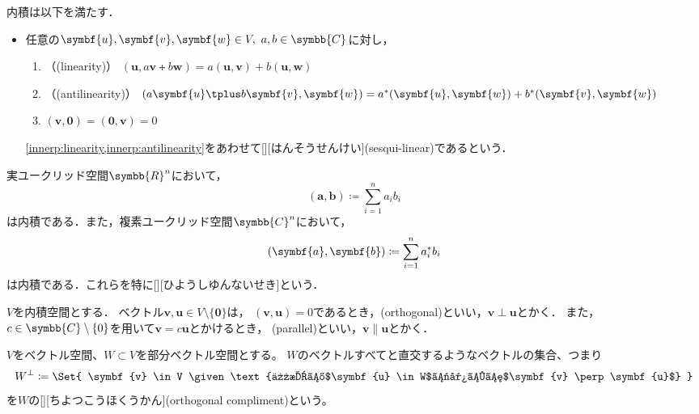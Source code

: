 \documentclass[../sotsu.tex]{subfiles}
\begin{document}
\begin{corollary}
    内積は以下を満たす．
    \begin{itemize}
        \item 任意の$\symbf{u}, \symbf{v}, \symbf{w} \in V, \  a, b \in \symbb{C}$に対し，
        \begin{enumerate}
            \item \label{innerp:linearity} （(linearity)） $(\symbf{u}, a\symbf{v} \tplus b\symbf{w}) = a (\symbf{u}, \symbf{v}) + b (\symbf{u}, \symbf{w})$
            \item \label{innerp:antilinearity} （(antilinearity)） $(a\symbf{u} \tplus b\symbf{v}, \symbf{w}) = \conj{a} (\symbf{u}, \symbf{w}) + \conj{b} (\symbf{v}, \symbf{w})$
            \item $(\symbf{v}, \symbf{0}) = (\symbf{0}, \symbf{v}) = 0$
        \end{enumerate}

        \cref{innerp:linearity,innerp:antilinearity}をあわせて[][はんそうせんけい](sesqui-linear)であるという．
    \end{itemize}
\end{corollary}


\begin{example}
    実ユークリッド空間$\symbb{R}^n$において，
    \begin{equation*}
        (\symbf{a}, \symbf{b}) \coloneq \sum_{i=1}^{n} a_i b_i
    \end{equation*}
    は内積である．また，複素ユークリッド空間$\symbb{C}^n$において，
    \begin{equation*}
        (\symbf{a}, \symbf{b}) \coloneq \sum_{i=1}^{n} \conj{a_i} b_i
    \end{equation*}
    は内積である．これらを特に[][ひようしゆんないせき]という．
\end{example}


\begin{definition}
    \label{dfn:orthogonal}
    \label{dfn:parallel}
    $V$を内積空間とする．
    ベクトル$\symbf{v}, \symbf{u} \in V \setminus \{\symbf{0}\}$は，
    $(\symbf{v}, \symbf{u}) = 0$であるとき，(orthogonal)といい，$\symbf{v} \perp \symbf{u}$とかく．
    また，$c \in \symbb{C} \setminus \{0\}$を用いて$\symbf{v} = c\symbf{u}$とかけるとき，
    (parallel)といい，$\symbf{v} \parallel \symbf{u}$とかく．
\end{definition}


\begin{definition}[直交補空間]
    $V$をベクトル空間、$W \subset V$を部分ベクトル空間とする。
    $W$のベクトルすべてと直交するようなベクトルの集合、つまり
    \begin{equation}
        W^\perp  \coloneq  \Set{  \symbf{v} \in V  
                                \given  \text{任意の$\symbf{u} \in W$に対して$\symbf{v} \perp \symbf{u}$}  }
    \end{equation}
    を$W$の[][ちよつこうほくうかん](orthogonal compliment)という。
\end{definition}
\end{document}
